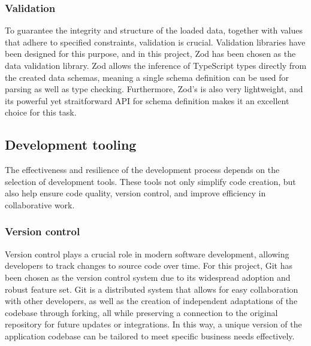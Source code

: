 \subsubsection{Validation}

To guarantee the integrity and structure of the loaded data, together with values that adhere to specified constraints, validation is crucial. Validation libraries have been designed for this purpose, and in this project, Zod has been chosen as the data validation library. Zod allows the inference of TypeScript types directly from the created data schemas, meaning a single schema definition can be used for parsing as well as type checking. Furthermore, Zod's is also very lightweight, and its powerful yet straitforward API for schema definition makes it an excellent choice for this task. \cite{Bhimani2023}


\subsection{Development tooling}

The effectiveness and resilience of the development process depends on the selection of development tools. These tools not only simplify code creation, but also help ensure code quality, version control, and improve efficiency in collaborative work.

\subsubsection{Version control}

Version control plays a crucial role in modern software development, allowing developers to track changes to source code over time. For this project, Git has been chosen as the version control system due to its widespread adoption and robust feature set. Git is a distributed system that allows for easy collaboration with other developers, as well as the creation of independent adaptations of the codebase through forking, all while preserving a connection to the original repository for future updates or integrations. In this way, a unique version of the application codebase can be tailored to meet specific business needs effectively.  \cite{Ponuthorai2022}

